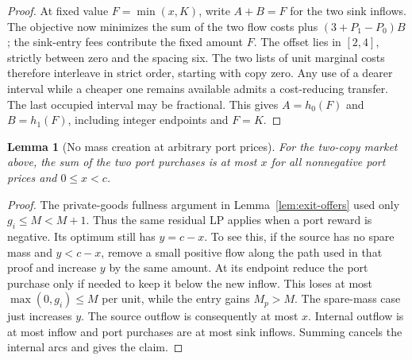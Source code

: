 \documentclass[11pt,oneside,openany,notitlepage]{report}
\newtheorem{lemma}[theorem]{Lemma}
\begin{document}
\begin{proof}
At fixed value \(F=\min(x,K)\), write \(A+B=F\) for the two sink inflows.
The objective now minimizes the sum of the two flow costs plus
\((3+P_1-P_0)B\); the sink-entry fees contribute the fixed amount \(F\).
The offset lies in \([2,4]\), strictly between zero and the spacing six.
The two lists of unit marginal costs therefore interleave in strict order,
starting with copy zero. Any use of a dearer interval while a cheaper
one remains available admits a cost-reducing transfer. The last occupied
interval may be fractional. This gives \(A=h_0(F)\) and \(B=h_1(F)\),
including integer endpoints and \(F=K\).
\end{proof}

\begin{lemma}[No mass creation at arbitrary port prices]\label{lem:no-creation}
For the two-copy market above, the sum of the two port purchases is at
most \(x\) for all nonnegative port prices and \(0\le x<c\).
\end{lemma}
\begin{proof}
The private-goods fullness argument in Lemma~\ref{lem:exit-offers} used
only \(g_i\le M<M+1\). Thus the same residual LP applies when a port
reward is negative. Its optimum still has \(y=c-x\). To see this, if the
source has no spare mass and \(y<c-x\), remove a small positive flow
along the path used in that proof and increase \(y\) by the same amount.
At its endpoint reduce the port purchase only if needed to keep it below
the new inflow. This loses at most \(\max(0,g_i)\le M\) per unit, while
the entry gains \(M_p>M\). The spare-mass case just increases \(y\).
The source outflow is consequently at most \(x\). Internal outflow is at
most inflow and port purchases are at most sink inflows. Summing cancels
the internal arcs and gives the claim.
\end{proof}
\end{document}
